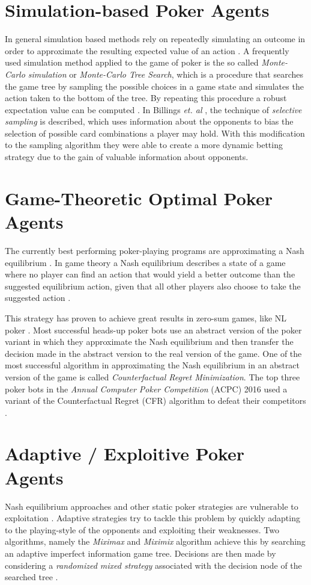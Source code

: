 \section{Simulation-based Poker Agents}
In general simulation based methods rely on repeatedly simulating an outcome in order to approximate the resulting expected value of an action \cite{master_nuno}. A frequently used simulation method applied to the game of poker is the so called \textit{Monte-Carlo simulation} or \textit{Monte-Carlo Tree Search}, which is a procedure that searches the game tree by sampling the possible choices in a game state and simulates the action taken to the bottom of the tree. By repeating this procedure a robust expectation value can be computed \cite{review}. 
In Billings \textit{et. al} \cite{selective_sampling}, the technique of \textit{selective sampling} is described, which uses information about the opponents to bias the selection of possible card combinations a player may hold. With this modification to the sampling algorithm they were able to create a more dynamic betting strategy due to the gain of valuable information about opponents. 
\section{Game-Theoretic Optimal Poker Agents}
The currently best performing poker-playing programs are approximating a Nash equilibrium \cite{quality_of_bots}.
In game theory a Nash equilibrium describes a state of a game where no player can find an action that would yield a better outcome than the suggested equilibrium action, given that all other players also choose to take the suggested action \cite{game_theory}. \par
This strategy has proven to achieve great results in zero-sum games, like NL  poker \cite{master_nuno}. Most successful heads-up poker bots use an abstract version of the poker variant in which they approximate the Nash equilibrium and then transfer the decision made in the abstract version to the real version of the game. One of the most successful algorithm in approximating the Nash equilibrium in an abstract version of the game is called \textit{Counterfactual Regret Minimization}. The top three poker bots in the \textit{Annual Computer Poker Competition} (ACPC) 2016 used a variant of the Counterfactual Regret (CFR) algorithm to defeat their competitors \cite{quality_of_bots}.
\section{Adaptive / Exploitive Poker Agents}
Nash equilibrium approaches and other static poker strategies are vulnerable to exploitation \cite{master_nuno}.
Adaptive strategies try to tackle this problem by quickly adapting to the playing-style of the opponents and exploiting their weaknesses. Two algorithms, namely the \textit{Miximax} and \textit{Miximix} algorithm achieve this by searching an adaptive imperfect information game tree. Decisions are then made by considering a \textit{randomized mixed strategy} associated with the decision node of the searched tree \cite{billings_phd}.%
